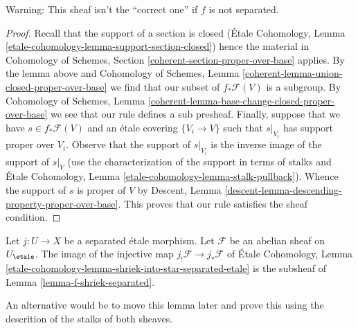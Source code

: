 \noindent
Warning: This sheaf isn't the ``correct one'' if $f$ is not separated.

\begin{proof}
Recall that the support of a section is closed
(\'Etale Cohomology, Lemma \ref{etale-cohomology-lemma-support-section-closed})
hence the material in
Cohomology of Schemes, Section \ref{coherent-section-proper-over-base}
applies. By the lemma above and
Cohomology of Schemes, Lemma \ref{coherent-lemma-union-closed-proper-over-base}
we find that our subset of $f_*\mathcal{F}(V)$ is a subgroup.
By Cohomology of Schemes, Lemma
\ref{coherent-lemma-base-change-closed-proper-over-base}
we see that our rule defines a sub presheaf.
Finally, suppose that we have $s \in f_*\mathcal{F}(V)$
and an \'etale covering $\{V_i \to V\}$ such that
$s|_{V_i}$ has support proper over $V_i$.
Observe that the support of $s|_{V_i}$ is the inverse
image of the support of $s|_V$ (use the characterization
of the support in terms of stalks and
\'Etale Cohomology, Lemma \ref{etale-cohomology-lemma-stalk-pullback}).
Whence the support of $s$ is proper of $V$ by
Descent, Lemma \ref{descent-lemma-descending-property-proper-over-base}.
This proves that our rule satisfies the sheaf condition.
\end{proof}

\begin{lemma}
\label{lemma-separated-etale-shriek}
Let $j : U \to X$ be a separated \'etale morphism. Let $\mathcal{F}$
be an abelian sheaf on $U_\etale$. The image of the injective map
$j_!\mathcal{F} \to j_*\mathcal{F}$ of
\'Etale Cohomology, Lemma
\ref{etale-cohomology-lemma-shriek-into-star-separated-etale}
is the subsheaf of Lemma \ref{lemma-f-shriek-separated}.
\end{lemma}

\noindent
An alternative would be to move this lemma later and prove this
using the descrition of the stalks of both sheaves.

